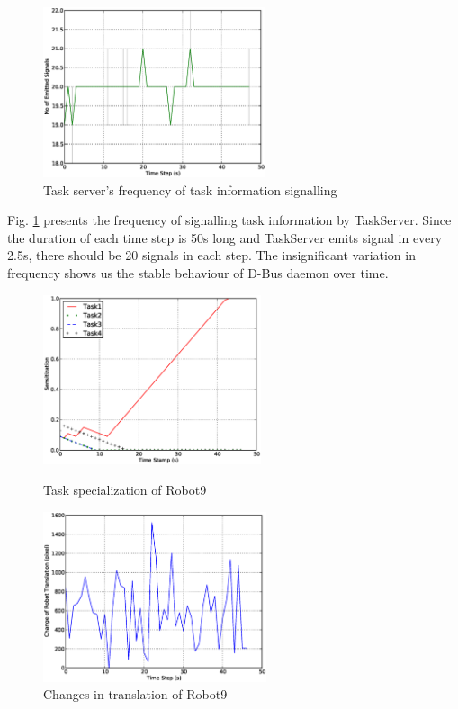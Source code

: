 \documentclass{llncs}
\begin{document}
\begin{figure}
\centering
\includegraphics[height=5cm, angle=0]
{images/global/Global-SignalingFreqStat.eps}
\caption{\small Task server's frequency of task information signalling}
\label{fig:signal-frequency-stat} %
\end{figure}
Fig. \ref{fig:signal-frequency-stat} presents the frequency of signalling task information by TaskServer. Since the duration of each time step is 50s long and TaskServer emits signal in every 2.5s, there should be 20 signals in each step. The insignificant variation in frequency shows us the stable behaviour of D-Bus daemon over time.
\begin{figure}
\begin{minipage}[t]{0.5\linewidth}
\centering
\includegraphics[height=5cm, angle=0]{images/global/PlotRobot9-Sensitizations-2010Feb18-121037.eps}
\caption{\small Task specialization of Robot9}
\label{fig:single-robot-sensitizations} %
\end{minipage} 
\begin{minipage}[t]{0.5\linewidth}
\centering
\includegraphics[height=5cm, angle=0]{images/global/DeltaRobot9-PoseAtTS-2010Feb18-121037.eps}
\caption{\small Changes in translation of Robot9}
\label{fig:single-robot-translation} %
\end{minipage}
\end{figure}
\end{document}
